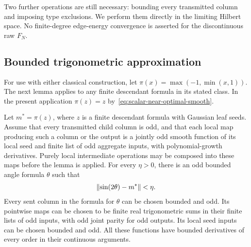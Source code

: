 Two further operations are still necessary: bounding every
transmitted column and imposing type exclusions. We perform
them directly in the limiting Hilbert space. No finite-degree
edge-energy convergence is asserted for the discontinuous raw
$F_N$.

\subsection{Bounded trigonometric approximation}

For use with either classical construction, let
$\pi(x)=\max(-1,\min(x,1))$. The next lemma applies to any finite
descendant formula in its stated class. In the present application
$\pi(z)=z$ by~\eqref{eq:scalar-near-optimal-smooth}.

\begin{lemma}
\label{lem:classical-trigonometric-density}
Let $m^*=\pi(z)$, where $z$ is a finite descendant formula with
Gaussian leaf seeds.  Assume that every transmitted child column
is odd, and that each local map producing such a column or the
output is a jointly odd smooth function of its local seed and
finite list of odd aggregate inputs, with polynomial-growth
derivatives.  Purely local intermediate operations may be composed
into these maps before the lemma is applied.
For every $\eta>0$, there is an odd bounded angle formula $\theta$
such that
\begin{equation}
 \lVert \sin(2\theta)-m^*\rVert<\eta.
 \label{eq:angle-density}
\end{equation}
Every sent column in the formula for $\theta$ can be chosen bounded
and odd.  Its pointwise maps can be chosen to be finite real
trigonometric sums in their finite lists of odd inputs, with odd
joint parity for odd outputs.  Its local seed inputs can be chosen
bounded and odd.  All these functions have bounded derivatives of
every order in their continuous arguments.
\end{lemma}

